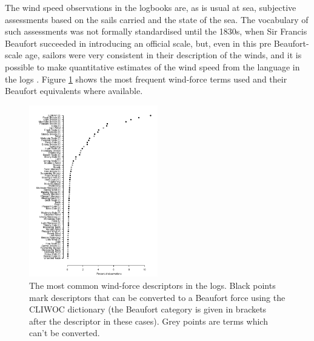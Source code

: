 \documentclass[CP]{copernicus}
\begin{document}
The wind speed observations in the logbooks are, as is usual at sea, subjective assessments based on the sails carried and the state of the sea. The vocabulary of such assessments was not formally standardised until the 1830s, when Sir Francis Beaufort succeeded in introducing an official scale, but, even in this pre Beaufort-scale age, sailors were very consistent in their description of the winds, and it is possible to make quantitative estimates of the wind speed from the language in the logs \citep{cliwoc03dictionary}. Figure \ref{pwat4} shows the most frequent wind-force terms used and their Beaufort equivalents where available.
\begin{figure}[!hbp]
\begin{center}
\includegraphics[angle=0, width=0.5\textwidth]{fig7.pdf}
\caption{The most common wind-force descriptors in the logs. Black points mark descriptors that can be converted to a Beaufort force using the CLIWOC dictionary (the Beaufort category is given in brackets after the descriptor in these cases). Grey points are terms which can't be converted.}
\label{pwat4}
\end{center}
\end{figure}
\end{document}
